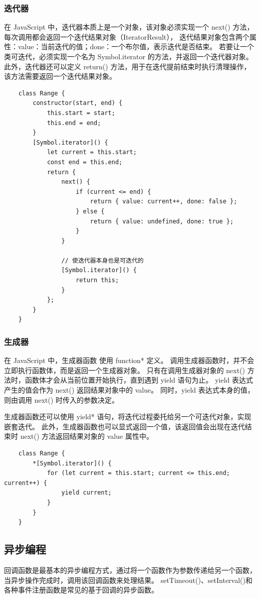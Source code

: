 \subsubsection{迭代器}
在 JavaScript 中，迭代器本质上是一个对象，该对象必须实现一个 next() 方法，
每次调用都会返回一个迭代结果对象（IteratorResult），
迭代结果对象包含两个属性：value：当前迭代的值；done：一个布尔值，表示迭代是否结束。
若要让一个类可迭代，必须实现一个名为 Symbol.iterator 的方法，并返回一个迭代器对象。
此外，迭代器还可以定义 return() 方法，用于在迭代提前结束时执行清理操作，该方法需要返回一个迭代结果对象。
\begin{verbatim}
    class Range {
        constructor(start, end) {
            this.start = start;
            this.end = end;
        }
        [Symbol.iterator]() {
            let current = this.start;
            const end = this.end;
            return {
                next() {
                    if (current <= end) {
                        return { value: current++, done: false };
                    } else {
                        return { value: undefined, done: true };
                    }
                }

                // 使迭代器本身也是可迭代的
                [Symbol.iterator]() {
                    return this;
                }
            };
        }
    }
\end{verbatim}

\subsubsection{生成器}
在 JavaScript 中，生成器函数 使用 function* 定义。
调用生成器函数时，并不会立即执行函数体，而是返回一个生成器对象。
只有在调用生成器对象的 next() 方法时，函数体才会从当前位置开始执行，直到遇到 yield 语句为止。
yield 表达式产生的值会作为 next() 返回结果对象中的 value。
同时，yield 表达式本身的值，则由调用 next() 时传入的参数决定。

生成器函数还可以使用 yield* 语句，将迭代过程委托给另一个可迭代对象，实现嵌套迭代。
此外，生成器函数也可以显式返回一个值，该返回值会出现在迭代结束时 next() 方法返回结果对象的 value 属性中。
\begin{verbatim}
    class Range {
        *[Symbol.iterator]() {
            for (let current = this.start; current <= this.end; current++) {
                yield current;
            }
        }
    }
\end{verbatim}

\subsection{异步编程}
回调函数是最基本的异步编程方式，通过将一个函数作为参数传递给另一个函数，
当异步操作完成时，调用该回调函数来处理结果。
setTimeout()、setInterval()和各种事件注册函数是常见的基于回调的异步函数。

